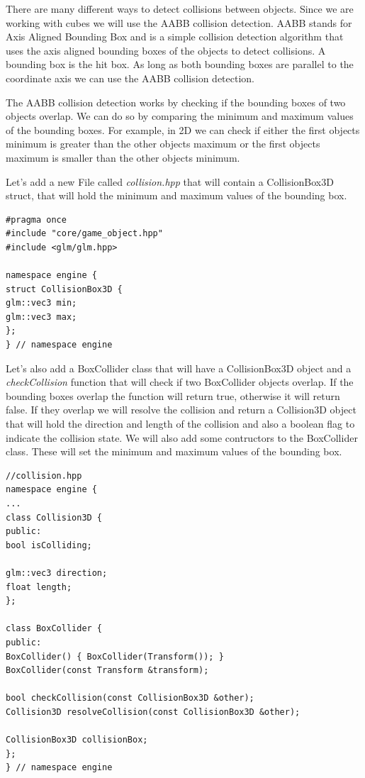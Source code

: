 \documentclass[12pt]{report} \usepackage{preamble}
\begin{document}
There are many different ways to detect collisions between objects. Since we are working with cubes we will use the AABB collision detection.
AABB stands for Axis Aligned Bounding Box and is a simple collision detection algorithm that uses the axis aligned bounding boxes of the objects to detect collisions.
A bounding box is the hit box. As long as both bounding boxes are parallel to the coordinate axis we can use the AABB collision detection.

The AABB collision detection works by checking if the bounding boxes of two objects overlap. We can do so by comparing the minimum and maximum values of the bounding boxes.
For example, in 2D we can check if either the first objects minimum is greater than the other objects maximum or the first objects maximum is smaller than the other objects minimum.

Let's add a new File called \textit{collision.hpp} that will contain a CollisionBox3D struct, that will hold the minimum and maximum values of the bounding box.

\begin{lstlisting}[Language=C++]
#pragma once
#include "core/game_object.hpp"
#include <glm/glm.hpp>

namespace engine {
struct CollisionBox3D {
glm::vec3 min;
glm::vec3 max;
};
} // namespace engine
\end{lstlisting}

Let's also add a BoxCollider class that will have a CollisionBox3D object and a \textit{checkCollision} function that will check if two BoxCollider objects overlap.
If the bounding boxes overlap the function will return true, otherwise it will return false. If they overlap we will resolve the collision
and return a Collision3D object that will hold the direction and length of the collision and also a boolean flag to indicate the collision state.
We will also add some contructors to the BoxCollider class. These will set the minimum and maximum values of the bounding box.

\begin{lstlisting}[Language=C++]
//collision.hpp
namespace engine {
...
class Collision3D {
public:
bool isColliding;

glm::vec3 direction;
float length;
};

class BoxCollider {
public:
BoxCollider() { BoxCollider(Transform()); }
BoxCollider(const Transform &transform);

bool checkCollision(const CollisionBox3D &other);
Collision3D resolveCollision(const CollisionBox3D &other);

CollisionBox3D collisionBox;
};
} // namespace engine
\end{lstlisting}
\end{document}
